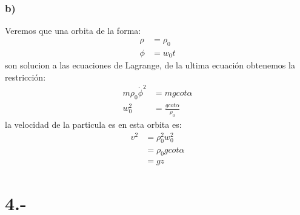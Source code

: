 \documentclass{article}
\begin{document}
\begin{tcolorbox}[breakable]
    \subsubsection*{b)}
    Veremos que una orbita de la forma:
    \begin{align*}
        \rho &= \rho_0 \\
        \phi &= w_0t
    \end{align*}
    son solucion a las ecuaciones de Lagrange, de la ultima ecuación obtenemos la restricción:
    \begin{align*}
        m\rho_0\dot{\phi}^2 &= mgcot\alpha \\
        w_0^2 &= \frac{gcot\alpha}{\rho_0} 
    \end{align*}
    la velocidad de la particula es en esta orbita es: 
    \begin{align*}
        v^2 
        &= \rho_0^2w_0^2 \\
        &= \rho_0gcot\alpha \\ 
        &= gz
    \end{align*}
\end{tcolorbox}

\section*{4.-}
\end{document}
